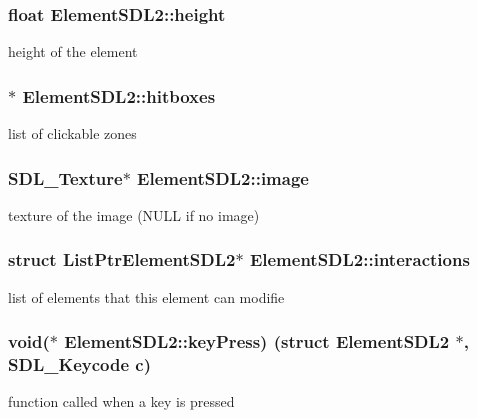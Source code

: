 \subsubsection[{\texorpdfstring{height}{height}}]{\setlength{\rightskip}{0pt plus 5cm}float Element\+S\+D\+L2\+::height}\hypertarget{structElementSDL2_aa85848e696ee9420c7993d395ed883be}{}\label{structElementSDL2_aa85848e696ee9420c7993d395ed883be}
height of the element 
\subsubsection[{\texorpdfstring{hitboxes}{hitboxes}}]{$\ast$ Element\+S\+D\+L2\+::hitboxes}\hypertarget{structElementSDL2_aa4af7ab8949d93544da609659a4011c0}{}\label{structElementSDL2_aa4af7ab8949d93544da609659a4011c0}
list of clickable zones 
\subsubsection[{\texorpdfstring{image}{image}}]{\setlength{\rightskip}{0pt plus 5cm}S\+D\+L\+\_\+\+Texture$\ast$ Element\+S\+D\+L2\+::image}\hypertarget{structElementSDL2_aab2ff0fd3a1c4370d7f1f9cdd250d056}{}\label{structElementSDL2_aab2ff0fd3a1c4370d7f1f9cdd250d056}
texture of the image (N\+U\+LL if no image) 
\subsubsection[{\texorpdfstring{interactions}{interactions}}]{\setlength{\rightskip}{0pt plus 5cm}struct {\bf List\+Ptr\+Element\+S\+D\+L2}$\ast$ Element\+S\+D\+L2\+::interactions}\hypertarget{structElementSDL2_aca39f22199862196fc52dfcecafeca4a}{}\label{structElementSDL2_aca39f22199862196fc52dfcecafeca4a}
list of elements that this element can modifie 
\subsubsection[{\texorpdfstring{key\+Press}{keyPress}}]{\setlength{\rightskip}{0pt plus 5cm}void($\ast$ Element\+S\+D\+L2\+::key\+Press) (struct {\bf Element\+S\+D\+L2} $\ast$, S\+D\+L\+\_\+\+Keycode c)}\hypertarget{structElementSDL2_aff1dc935700d44a0ef0d53de7cca9d41}{}\label{structElementSDL2_aff1dc935700d44a0ef0d53de7cca9d41}
function called when a key is pressed 
